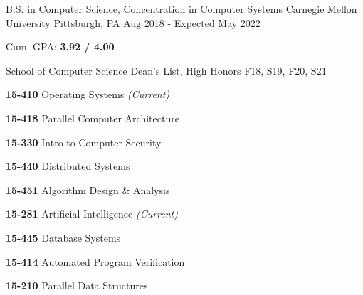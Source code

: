 
\begin{cventries}

  \cventry
    {B.S. in Computer Science, Concentration in Computer Systems} %
    {Carnegie Mellon University} %
    {Pittsburgh, PA} %
    {Aug 2018 - Expected May 2022} %
    {
      \begin{cvitems} %
      \item {Cum. GPA: \textbf{3.92 / 4.00}}
        \item {School of Computer Science Dean's List, High Honors F18, S19, F20, S21}
        \item {}
            \vspace{0.5mm}
            \setlength\multicolsep{0pt}
            \begin{multicols}{3}
              \item[] {\textbf{15-410} Operating Systems \textit{\color{awesome}(Current)}}
              \item[] {\textbf{15-418} Parallel Computer Architecture}
              \item[] {\textbf{15-330} Intro to Computer Security}
              \item[] {\textbf{15-440} Distributed Systems}
              \item[] {\textbf{15-451} Algorithm Design \& Analysis}
              \item[] {\textbf{15-281} Artificial Intelligence \textit{\color{awesome}(Current)}}
              \item[] {\textbf{15-445} Database Systems}
              \item[] {\textbf{15-414} Automated Program Verification}
              \item[] {\textbf{15-210} Parallel Data Structures}
            \end{multicols}
      \end{cvitems}
    }

\end{cventries}
